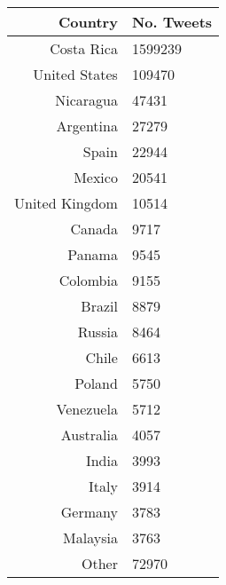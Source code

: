 \begin{table}[H]
    \begin{subtable}[h]{0.5\textwidth}
        \centering
        \begin{tabular}{r|l}
        \textbf{Country} & \textbf{No. Tweets} \\
        \hline
        Costa Rica & 1599239 \\
        United States & 109470 \\
        Nicaragua & 47431 \\
        Argentina & 27279 \\
        Spain & 22944 \\
        Mexico & 20541 \\
        United Kingdom & 10514 \\
        Canada & 9717 \\
        Panama & 9545 \\
        Colombia & 9155 \\
        Brazil & 8879 \\
        Russia & 8464 \\
        Chile & 6613 \\
        Poland & 5750 \\
        Venezuela & 5712 \\
        Australia & 4057 \\
        India & 3993 \\
        Italy & 3914 \\
        Germany & 3783 \\
        Malaysia & 3763 \\
        Other & 72970 \\
        

\end{tabular}
\end{subtable}
\end{table}
